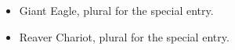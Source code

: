
\subtitle{2.0.1}

\begin{itemize}
\item Giant Eagle, plural for the special entry.
\item Reaver Chariot, plural for the special entry.
\end{itemize}
